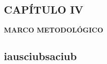 \begin{center}
    \setcounter{section}{4}
    \section*{CAPÍTULO IV}
    \vspace*{0.5in}
    \textbf{MARCO METODOLÓGICO}
\end{center}
\setcounter{subsection}{0}
\subsection{iausciubsaciub}
\newpage